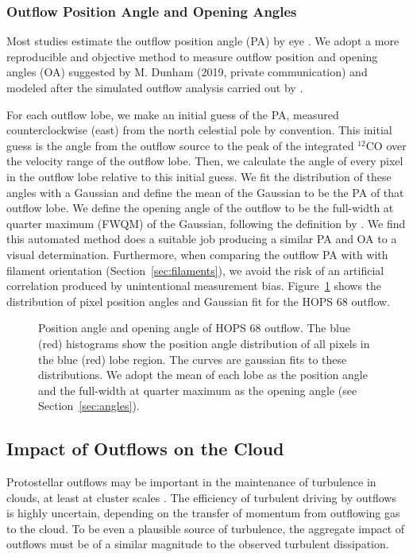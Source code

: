 \documentclass[twocolumn]{aastex63}
\newcommand{\example}{HOPS 68}
\newcommand{\co}[1][]{\ensuremath{^{#1}}CO}
\begin{document}
\subsubsection{Outflow Position Angle and Opening Angles\label{sec:angles}}
Most studies estimate the outflow position angle (PA) by eye \citep[e.g.][]{Morgan91,Takahashi08,Plunkett13,Stephens17,Kong19,Tanabe:submitted}. We adopt a more reproducible and objective method to measure outflow position and opening angles (OA)  suggested by M. Dunham (2019, private communication) and modeled after the simulated outflow analysis carried out by \citet{Offner11}.

For each outflow lobe, we make an initial guess of the PA, measured counterclockwise (east) from the north celestial pole by convention. This initial guess is the angle from the outflow source to the peak of the integrated \co[12]{} over the velocity range of the outflow lobe. Then, we calculate the angle of every pixel in the outflow lobe relative to this initial guess. We fit the distribution of these angles with a Gaussian and define the mean of the Gaussian to be the PA of that outflow lobe. We define the opening angle of the outflow to be the full-width at quarter maximum (FWQM) of the Gaussian, following the definition by \cite{Offner11}. We find this automated method does a suitable job producing a similar PA and OA to a visual determination. Furthermore, when comparing the outflow PA with with filament orientation (Section~\ref{sec:filaments}), we avoid the risk of an artificial correlation produced by unintentional measurement bias. Figure~\ref{fig:angles} shows the distribution of pixel position angles and Gaussian fit for the \example{} outflow.

\begin{figure}
\caption{Position angle and opening angle of \example{} outflow. The blue (red) histograms show the position angle distribution of all pixels in the blue (red) lobe region. The curves are gaussian fits to these distributions. We adopt the mean of each lobe as the position angle and the full-width at quarter maximum as the opening angle (see Section~\ref{sec:angles}).\label{fig:angles}}
\end{figure}


\subsection{Impact of Outflows on the Cloud}\label{sec:impact}
Protostellar outflows may be important in the maintenance of turbulence in clouds, at least at cluster scales \citep{Nakamura07}. The efficiency of turbulent driving by outflows is highly uncertain, depending on the transfer of momentum from outflowing gas to the cloud. To be even a plausible source of turbulence, the aggregate impact of outflows must be of a similar magnitude to the observed turbulent dissipation.
\end{document}
